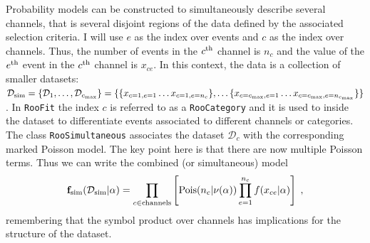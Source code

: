 \documentclass{cernrep}
\def\vec#1{\ifmmode
\mathchoice{\mbox{\boldmath$\displaystyle\bf#1$}}
{\mbox{\boldmath$\textstyle\bf#1$}}
{\mbox{\boldmath$\scriptstyle\bf#1$}}
{\mbox{\boldmath$\scriptscriptstyle\bf#1$}}\else
{\mbox{\boldmath$\bf#1$}}\fi}
\newcommand{\Pois}{{\ensuremath{\rm Pois}}}
\newcommand{\data}{{\ensuremath{\mathcal{D}}}}
\newcommand{\datasim}{{\ensuremath{\mathcal{D}_{\textrm{sim}}}}}
\newcommand{\F}{{\ensuremath{\mathbf{f}}}}
\begin{document}

Probability models can be constructed to simultaneously describe several channels, that is several disjoint regions of the data defined by the associated selection criteria.  I will use $e$ as the index over events and $c$ as the index over channels.  Thus, the number of events in the $c^{\rm th}$ channel is $n_c$ and the value of the $e^{\rm th}$ event in the $c^{\rm th}$ channel is $x_{ce}$.  In this context, the data is a collection of smaller datasets: \mbox{$\datasim=\{\data_1, \dots, \data_{c_{\rm max}}\}=\{\{x_{c=1,e=1}\dots x_{c=1,e=n_c}\}, \dots \{x_{c=c_{\rm max},e=1}\dots x_{c=c_{\rm max},e=n_{c_{\rm max}}} \}\}$}.  In \texttt{RooFit} the index $c$ is referred to as a \texttt{RooCategory} and it is used to inside the dataset to differentiate events associated to different channels or categories. The class \texttt{RooSimultaneous} associates the dataset $\data_c$ with the corresponding marked Poisson model.  The key point here is that there are now multiple Poisson terms.  Thus we can write the combined (or simultaneous) model 
\begin{equation}
\label{Eq:simultaneous}
\F_{\textrm{sim}}(\datasim|\alpha) = \prod_{c\in\rm channels} \left[ \Pois(n_c|\nu(\alpha)) \prod_{e=1}^{n_c} f(x_{ce}|\alpha) \right] \; ,
\end{equation}
remembering that the symbol product over channels has implications for the structure of the dataset.
\end{document}
